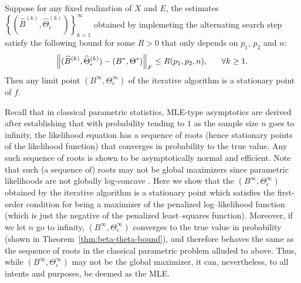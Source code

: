 \begin{theorem}\label{thm:convergence}
Suppose for any fixed realization of $X$ and $E$, the estimates $\left\{(\widehat{B}^{(k)},\widehat{\Theta}_\epsilon^{(k)})\right\}_{k=1}^\infty$ obtained by implemeting the alternating search step satisfy the following bound for some $R>0$ that only depends on $p_1$, $p_2$ and $n$:
\begin{equation*}
\left\lVert(\widehat{B}^{(k)},\widehat{\Theta}_\epsilon^{(k)})-(B^*,\Theta^*)\right\rVert_F\leq R(p_1,p_2,n),\quad~~\forall k\geq 1.
\end{equation*}
Then any limit point $(B^\infty,\Theta_\epsilon^\infty)$ of the iterative algorithm is a stationary point of $f$. 
\end{theorem}

\begin{remark}
Recall that in classical parametric statistics, MLE-type asymptotics are derived
after establishing that with probability tending to $1$ as the sample
size $n$ goes to infinity, the likelihood equation has a sequence of
roots (hence stationary points of the likelihood function)  that converges in probability to the true value. Any such sequence of roots is shown to be asymptotically normal and efficient. Note that such (a sequence of) roots may not be global maximizers since parametric likelihoods are not globally log-concave \cite[see Chapter 6][]{lehmann1998theory}. Here we show that the $(B^\infty,\Theta_\epsilon^\infty)$ obtained by the iterative algorithm is a
stationary point which satisfies the first-order condition for being a maximizer of the penalized log--likelihood function (which is just the negative of the penalized 
least--squares function). Moreover, if we let $n$ go to infinity, $(B^\infty,\Theta_\epsilon^\infty)$ converges to the true value in probability (shown in Theorem~\ref{thm:beta-theta-bound}), and therefore behaves the same as the sequence of roots in the classical parametric problem alluded to above. Thus, while 
$(B^\infty,\Theta_\epsilon^\infty)$ may not be the global maximizer, it can, nevertheless, to all intents and purposes, be deemed as the MLE.
\end{remark}

